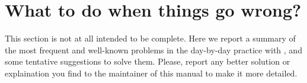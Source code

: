 
\thispagestyle{empty}
\section{What to do when things go wrong?}
\label{section:troubleshot}
%
This section is not at all intended to be complete. Here we report a summary of the
most frequent and well-known problems in the day-by-day practice with \WANT,
and some tentative suggestions to solve them. 
Please, report any better solution or explaination you find to the maintainer of this
manual to make it more detailed.

